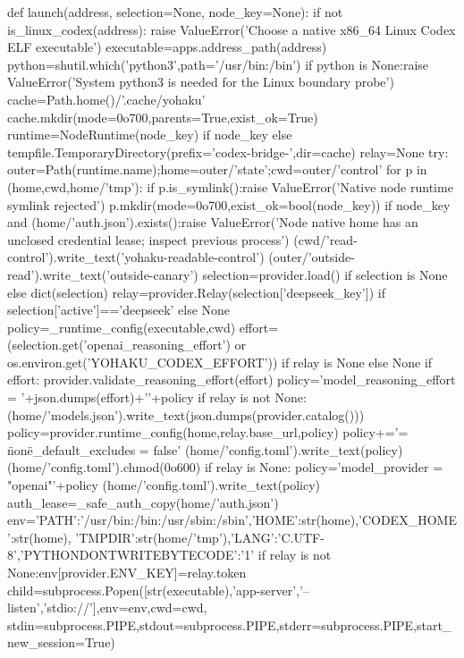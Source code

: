 def launch(address, selection=None, node_key=None):
    if not is_linux_codex(address):
        raise ValueError('Choose a native x86_64 Linux Codex ELF executable')
    executable=apps.address_path(address)
    python=shutil.which('python3',path='/usr/bin:/bin')
    if python is None:raise ValueError('System python3 is needed for the Linux boundary probe')
    cache=Path.home()/'.cache/yohaku'
    cache.mkdir(mode=0o700,parents=True,exist_ok=True)
    runtime=NodeRuntime(node_key) if node_key else tempfile.TemporaryDirectory(prefix='codex-bridge-',dir=cache)
    relay=None
    try:
        outer=Path(runtime.name);home=outer/'state';cwd=outer/'control'
        for p in (home,cwd,home/'tmp'):
            if p.is_symlink():raise ValueError('Native node runtime symlink rejected')
            p.mkdir(mode=0o700,exist_ok=bool(node_key))
        if node_key and (home/'auth.json').exists():raise ValueError('Node native home has an unclosed credential lease; inspect previous process')
        (cwd/'read-control').write_text('yohaku-readable-control')
        (outer/'outside-read').write_text('outside-canary')
        selection=provider.load() if selection is None else dict(selection)
        relay=provider.Relay(selection['deepseek_key']) if selection['active']=='deepseek' else None
        policy=_runtime_config(executable,cwd)
        effort=(selection.get('openai_reasoning_effort') or os.environ.get('YOHAKU_CODEX_EFFORT')) if relay is None else None
        if effort:
            provider.validate_reasoning_effort(effort)
            policy='model_reasoning_effort = '+json.dumps(effort)+'\n'+policy
        if relay is not None:
            (home/'models.json').write_text(json.dumps(provider.catalog()))
            policy=provider.runtime_config(home,relay.base_url,policy)
        policy+='\ninherit = \"none\"\nignore_default_excludes = false\n'
        (home/'config.toml').write_text(policy)
        (home/'config.toml').chmod(0o600)
        if relay is None:
            policy='model_provider = "openai"\n'+policy
            (home/'config.toml').write_text(policy)
            auth_lease=_safe_auth_copy(home/'auth.json')
        env={'PATH':'/usr/bin:/bin:/usr/sbin:/sbin','HOME':str(home),'CODEX_HOME':str(home),
             'TMPDIR':str(home/'tmp'),'LANG':'C.UTF-8','PYTHONDONTWRITEBYTECODE':'1'}
        if relay is not None:env[provider.ENV_KEY]=relay.token
        child=subprocess.Popen([str(executable),'app-server','--listen','stdio://'],env=env,cwd=cwd,
                               stdin=subprocess.PIPE,stdout=subprocess.PIPE,stderr=subprocess.PIPE,start_new_session=True)
